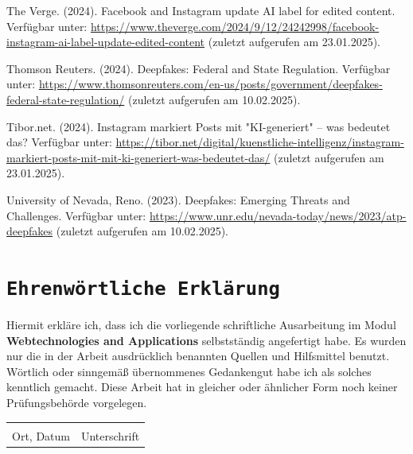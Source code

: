 \documentclass[a4paper,12pt]{article}
\begin{document}
\begin{thebibliography}{99}
 The Verge. (2024). Facebook and Instagram update AI label for edited content. 
Verfügbar unter: \url{https://www.theverge.com/2024/9/12/24242998/facebook-instagram-ai-label-update-edited-content} (zuletzt aufgerufen am 23.01.2025).

 Thomson Reuters. (2024). Deepfakes: Federal and State Regulation.  
Verfügbar unter: \url{https://www.thomsonreuters.com/en-us/posts/government/deepfakes-federal-state-regulation/} (zuletzt aufgerufen am 10.02.2025).

 Tibor.net. (2024). Instagram markiert Posts mit "KI-generiert" – was bedeutet das? 
Verfügbar unter: \url{https://tibor.net/digital/kuenstliche-intelligenz/instagram-markiert-posts-mit-mit-ki-generiert-was-bedeutet-das/} (zuletzt aufgerufen am 23.01.2025).

 University of Nevada, Reno. (2023). Deepfakes: Emerging Threats and Challenges.
Verfügbar unter: \url{https://www.unr.edu/nevada-today/news/2023/atp-deepfakes} (zuletzt aufgerufen am 10.02.2025).
\end{thebibliography}
\newpage

\newpage
{}
\section*{\texttt{Ehrenwörtliche Erklärung}}
Hiermit erkläre ich, dass ich die vorliegende schriftliche Ausarbeitung im Modul \textbf{Webtechnologies and Applications} selbstständig
angefertigt habe. Es wurden nur die in der Arbeit ausdrücklich benannten Quellen und
Hilfsmittel benutzt. Wörtlich oder sinngemäß übernommenes Gedankengut habe ich als
solches kenntlich gemacht. Diese Arbeit hat in gleicher oder ähnlicher Form noch keiner
Prüfungsbehörde vorgelegen.

\vspace{3cm}
\noindent\begin{tabular}{p{}p{}}
    \hrulefill & \hrulefill \\
    Ort, Datum & Unterschrift \\
\end{tabular}
\end{document}
